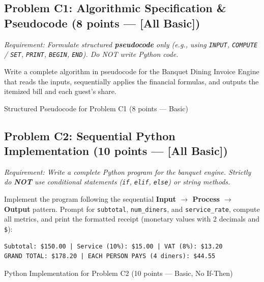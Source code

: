 \documentclass[11pt,a4paper]{article}
\begin{document}
\vspace{0.3mm}
\subsection*{Problem C1: Algorithmic Specification \& Pseudocode (8 points --- [All Basic])}
\textit{Requirement: Formulate structured \textbf{pseudocode} only (e.g., using \texttt{INPUT}, \texttt{COMPUTE} / \texttt{SET}, \texttt{PRINT}, \texttt{BEGIN}, \texttt{END}). Do NOT write Python code.}

Write a complete algorithm in pseudocode for the Banquet Dining Invoice Engine that reads the inputs, sequentially applies the financial formulas, and outputs the itemized bill and each guest's share.

\begin{answerbox}[height=5.5cm]{Structured Pseudocode for Problem C1 (8 points --- Basic)}
\end{answerbox}

\newpage


\subsection*{Problem C2: Sequential Python Implementation (10 points --- [All Basic])}
\textit{Requirement: Write a complete Python program for the banquet engine. Strictly do \textbf{NOT} use conditional statements (\texttt{if}, \texttt{elif}, \texttt{else}) or string methods.}

Implement the program following the sequential \textbf{Input $\rightarrow$ Process $\rightarrow$ Output} pattern. Prompt for \texttt{subtotal}, \texttt{num\_diners}, and \texttt{service\_rate}, compute all metrics, and print the formatted receipt (monetary values with 2 decimals and \texttt{\$}):

\begin{lstlisting}[basicstyle=\ttfamily\scriptsize]
Subtotal: $150.00 | Service (10%): $15.00 | VAT (8%): $13.20
GRAND TOTAL: $178.20 | EACH PERSON PAYS (4 diners): $44.55
\end{lstlisting}

\vspace{0.8mm}
\begin{answerbox}[height=20.5cm]{Python Implementation for Problem C2 (10 points --- Basic, No If-Then)}
\end{answerbox}
\end{document}
